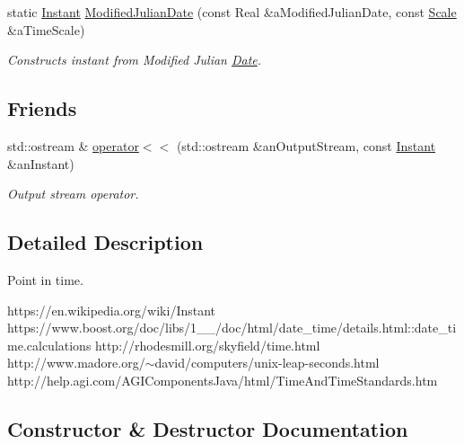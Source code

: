 \begin{DoxyCompactItemize}
static \hyperlink{classlibrary_1_1physics_1_1time_1_1_instant}{Instant} \hyperlink{classlibrary_1_1physics_1_1time_1_1_instant_a800d784f67ed5eaa6432b71f4534a170}{Modified\+Julian\+Date} (const Real \&a\+Modified\+Julian\+Date, const \hyperlink{namespacelibrary_1_1physics_1_1time_a09d2bc9fbc7b0b5f92e1419bd655e6bb}{Scale} \&a\+Time\+Scale)
\begin{DoxyCompactList}\small\item\em Constructs instant from Modified Julian \hyperlink{classlibrary_1_1physics_1_1time_1_1_date}{Date}. \end{DoxyCompactList}\end{DoxyCompactItemize}
\subsection*{Friends}
\begin{DoxyCompactItemize}
\item 
std\+::ostream \& \hyperlink{classlibrary_1_1physics_1_1time_1_1_instant_a01668796f6ebfd8c23c2d0df17f00b65}{operator$<$$<$} (std\+::ostream \&an\+Output\+Stream, const \hyperlink{classlibrary_1_1physics_1_1time_1_1_instant}{Instant} \&an\+Instant)
\begin{DoxyCompactList}\small\item\em Output stream operator. \end{DoxyCompactList}\end{DoxyCompactItemize}


\subsection{Detailed Description}
Point in time. 

https\+://en.wikipedia.\+org/wiki/\+Instant https\+://www.boost.\+org/doc/libs/1\+\_\+\_/doc/html/date\+\_\+time/details.html\+::date\+\_\+time.\+calculations http\+://rhodesmill.org/skyfield/time.\+html http\+://www.madore.\+org/$\sim$david/computers/unix-\/leap-\/seconds.html http\+://help.agi.\+com/\+A\+G\+I\+Components\+Java/html/\+Time\+And\+Time\+Standards.htm 

\subsection{Constructor \& Destructor Documentation}
\mbox{\label{classlibrary_1_1physics_1_1time_1_1_instant_a7916a9d8acb9de4eda35f9d72086a618}} 
